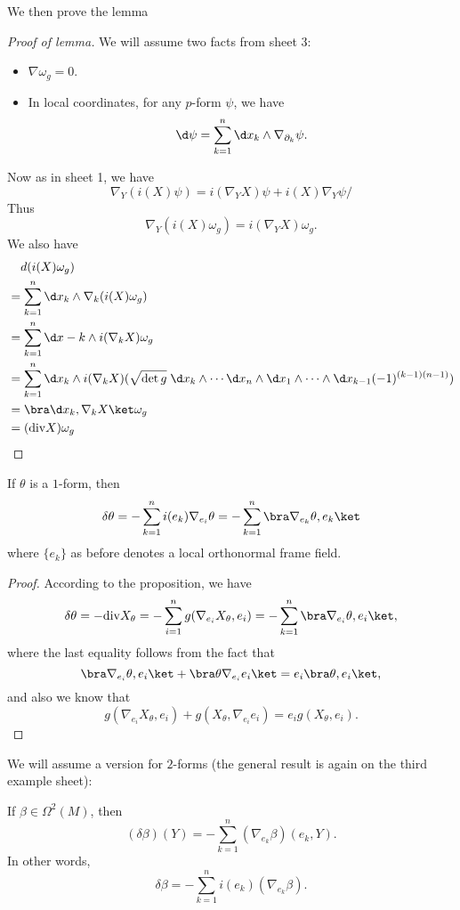 \documentclass[a4paper]{article}
\renewcommand\div{\mathrm{div}}
\begin{document}
We then prove the lemma
\begin{proof}[Proof of lemma]
  We will assume two facts from sheet 3:
  \begin{itemize}
    \item $\nabla \omega_g = 0$.
    \item In local coordinates, for any $p$-form $\psi$, we have
      \[
        \d \psi = \sum_{k = 1}^n \d x_k \wedge \nabla_{\partial_k} \psi.
      \]
  \end{itemize}
  Now as in sheet 1, we have
  \[
    \nabla_Y (i (X) \psi) = i(\nabla_Y X)\psi + i(X) \nabla_Y \psi/
  \]
  Thus
  \[
    \nabla_Y (i(X) \omega_g) = i(\nabla_Y X) \omega_g.
  \]
  We also have
  \begin{align*}
    &\hphantom{={}}d(i(X) \omega_g) \\
    &= \sum_{k = 1}^n \d x_k \wedge \nabla_k (i(X) \omega_g)\\
    &= \sum_{k = 1}^n \d x-k \wedge i(\nabla_k X) \omega_g\\
    &= \sum_{k = 1}^n \d x_k \wedge i (\nabla_k X) (\sqrt{\det g}\; \d x_k \wedge \cdots \d x_n \wedge \d x_1 \wedge \cdots \wedge \d x_{k - 1} (-1)^{(k - 1)(n - 1)})\\
    &= \bra \d x_k, \nabla_k X\ket \omega_g\\
    &= (\div X) \omega_g
  \end{align*}
\end{proof}

\begin{cor}
  If $\theta$ is a $1$-form, then
  \[
    \delta \theta = - \sum_{k = 1}^n i(e_k) \nabla_{e_i} \theta = - \sum_{k = 1}^n \bra \nabla_{e_k} \theta, e_k\ket
  \]
  where $\{e_k\}$ as before denotes a local orthonormal frame field.
\end{cor}

\begin{proof}
  According to the proposition, we have
  \[
    \delta \theta = - \div X_\theta = -\sum_{i = 1}^n g(\nabla_{e_i} X_\theta, e_i) = - \sum_{k = 1}^n \bra \nabla_{e_i} \theta, e_i\ket,
  \]
  where the last equality follows from the fact that
  \[
    \bra \nabla_{e_i} \theta, e_i\ket + \bra \theta \nabla_{e_i}e_i\ket = e_i \bra \theta, e_i\ket,
  \]
  and also we know that
  \[
    g(\nabla_{e_i} X_\theta, e_i) + g(X_\theta, \nabla_{e_i}e_i) = e_i g(X_\theta, e_i).
  \]
\end{proof}
We will assume a version for $2$-forms (the general result is again on the third example sheet):
\begin{prop}
  If $\beta \in \Omega^2(M)$, then
  \[
    (\delta \beta)(Y) = - \sum_{k = 1}^n (\nabla_{e_k} \beta)(e_k, Y).
  \]
  In other words,
  \[
    \delta \beta = - \sum_{k = 1}^n i(e_k) (\nabla_{e_k}\beta).
  \]
\end{prop}
\end{document}
